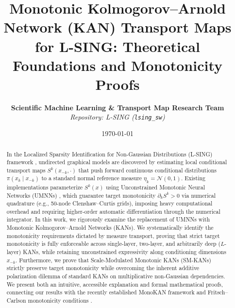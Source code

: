 \documentclass[11pt,a4paper]{article}
\title{\textbf{Monotonic Kolmogorov--Arnold Network (KAN) Transport Maps for L-SING: Theoretical Foundations and Monotonicity Proofs}}
\author{\textbf{Scientific Machine Learning \& Transport Map Research Team} \\
\textit{Repository: L-SING (\texttt{lsing\_sw})}}
\date{\today}
\theoremstyle{plain}
\theoremstyle{definition}
\theoremstyle{remark}
\begin{document}
\maketitle

\begin{abstract}
In the Localized Sparsity Identification for Non-Gaussian Distributions (L-SING) framework \cite{liaw2025learning}, undirected graphical models are discovered by estimating local conditional transport maps $S^k(x_{-k}, \cdot)$ that push forward continuous conditional distributions $\pi(x_k \mid x_{-k})$ to a standard normal reference measure $\eta_k = \mathcal{N}(0, 1)$. Existing implementations parameterize $S^k(x)$ using Unconstrained Monotonic Neural Networks (UMNNs) \cite{wehenkel2019unconstrained}, which guarantee target monotonicity $\partial_k S^k > 0$ via numerical quadrature (e.g., 50-node Clenshaw--Curtis grids), imposing heavy computational overhead and requiring higher-order automatic differentiation through the numerical integrator. In this work, we rigorously examine the replacement of UMNNs with Monotonic Kolmogorov--Arnold Networks (KANs). We systematically identify the monotonicity requirements dictated by measure transport, proving that strict target monotonicity is fully enforceable across single-layer, two-layer, and arbitrarily deep ($L$-layer) KANs, while retaining unconstrained expressivity along conditioning dimensions $x_{-k}$. Furthermore, we prove that Scale-Modulated Monotonic KANs (SM-KANs) strictly preserve target monotonicity while overcoming the inherent additive polarization dilemma of standard KANs on multiplicative non-Gaussian dependencies. We present both an intuitive, accessible explanation and formal mathematical proofs, connecting our results with the recently established MonoKAN framework \cite{polomolina2025monokan} and Fritsch--Carlson monotonicity conditions \cite{fritsch1980monotone}.
\end{abstract}

\tableofcontents
\newpage
\end{document}
